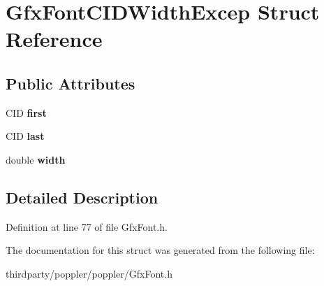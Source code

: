 \hypertarget{struct_gfx_font_c_i_d_width_excep}{}\section{Gfx\+Font\+C\+I\+D\+Width\+Excep Struct Reference}
\label{struct_gfx_font_c_i_d_width_excep}
\subsection*{Public Attributes}
\begin{DoxyCompactItemize}
\item 
\mbox{\label{struct_gfx_font_c_i_d_width_excep_abbfd52b12685280be5ee7f91d0222b5d}} 
C\+ID {\bfseries first}
\item 
\mbox{\label{struct_gfx_font_c_i_d_width_excep_a3e23d17f79ad1f6e196cd4b5fa322d3a}} 
C\+ID {\bfseries last}
\item 
\mbox{\label{struct_gfx_font_c_i_d_width_excep_a3e080a0d262dd0810250ea111f5dc12f}} 
double {\bfseries width}
\end{DoxyCompactItemize}


\subsection{Detailed Description}


Definition at line 77 of file Gfx\+Font.\+h.



The documentation for this struct was generated from the following file\+:\begin{DoxyCompactItemize}
\item 
thirdparty/poppler/poppler/Gfx\+Font.\+h\end{DoxyCompactItemize}
